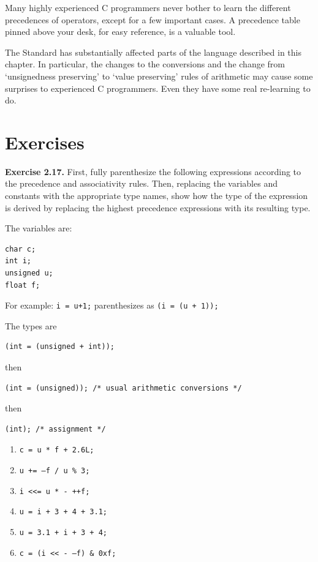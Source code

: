   Many highly experienced C programmers never bother to learn the
   different precedences of operators, except for a few important cases. A
   precedence table pinned above your desk, for easy reference, is a valuable
   tool.


  The Standard has substantially affected parts of the language described
   in this chapter. In particular, the changes to the conversions and the
   change from `unsignedness preserving' to `value preserving'
   rules of arithmetic may cause some surprises to experienced
   C programmers.  Even they have some real re-learning to do.


 
        \section{Exercises}
        


  \textbf{Exercise 2.17.} First, fully parenthesize the following expressions according to the
    precedence and associativity rules. Then, replacing the variables and
    constants with the appropriate type names, show how the type of the
    expression is derived by replacing the highest precedence expressions with
    its resulting type.

The variables are:

\begin{Verbatim}
char c;
int i;
unsigned u;
float f;
\end{Verbatim}
For example: \texttt{i = u+1;} parenthesizes
    as \texttt{(i = (u + 1));}

The types are

\begin{Verbatim}
(int = (unsigned + int));
\end{Verbatim}
then

\begin{Verbatim}
(int = (unsigned)); /* usual arithmetic conversions */
\end{Verbatim}
then

\begin{Verbatim}
(int); /* assignment */
\end{Verbatim}
\begin{enumerate}
    \item \texttt{c = u * f + 2.6L;}
    \item \texttt{u += --f / u \% 3;}
    \item \texttt{i <<= u * - ++f;}
    \item \texttt{u = i + 3 + 4 + 3.1;}
    \item \texttt{u = 3.1 + i + 3 + 4;}
    \item \texttt{c = (i << - --f) \& 0xf;}
   \end{enumerate}

